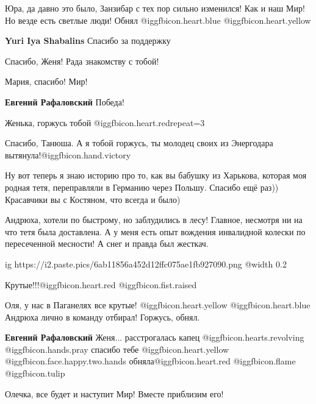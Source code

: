 \begin{itemize}
Юра, да давно это было, Занзибар с тех пор сильно изменился! Как и наш Мир! Но
везде есть светлые люди! Обнял @igg{fbicon.heart.blue}  @igg{fbicon.heart.yellow} 

\textbf{Yuri Iya Shabalins} Спасибо за поддержку

Спасибо, Женя! Рада знакомству с тобой!

\begin{itemize} %
Мария, спасибо! Мир!

\textbf{Евгений Рафаловский} Победа!
\end{itemize} %

Женька, горжусь тобой @igg{fbicon.heart.red}{repeat=3}

Спасибо, Танюша. А я тобой горжусь, ты молодец своих из Энергодара вытянула!@igg{fbicon.hand.victory}


Ну вот теперь я знаю историю про то, как вы бабушку из Харькова, которая моя
родная тетя, переправляли в Германию через Польшу. Спасибо ещё раз)) Красавчики
вы с Костяном, что всегда и было)


Андрюха, хотели по быстрому, но заблудились в лесу! Главное, несмотря ни на что
тетя была доставлена. А у меня есть опыт вождения инвалидной колески по
пересеченной месности! А снег и правда был жесткач.

\ifcmt
  ig https://i2.paste.pics/6ab11856a452d12ffc075ae1fb927090.png
  @width 0.2
\fi

Крутые!!!@igg{fbicon.heart.red} @igg{fbicon.fist.raised} ️

\begin{itemize} %
Оля, у нас в Паганелях все крутые!  @igg{fbicon.heart.yellow}  @igg{fbicon.heart.blue}  Андрюха лично в команду отбирал! Горжусь, обнял.

\textbf{Евгений Рафаловский} Женя... расстрогалась капец @igg{fbicon.hearts.revolving}  @igg{fbicon.hands.pray}  спасибо тебе @igg{fbicon.heart.yellow}  @igg{fbicon.face.happy.two.hands}  обняла@igg{fbicon.heart.red} @igg{fbicon.flame}  @igg{fbicon.tulip} 

Олечка, все будет и наступит Мир! Вместе приблизим его!
\end{itemize} %


\end{itemize}
